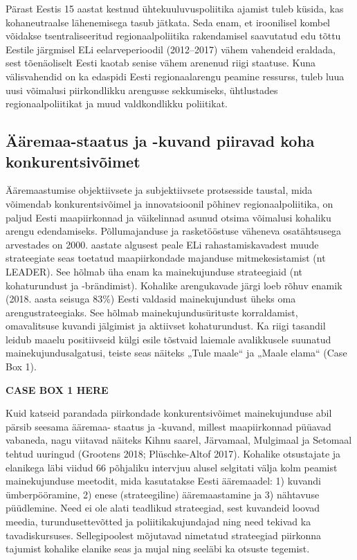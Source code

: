 \documentclass[]{book}
\begin{document}
Pärast Eestis 15 aastat kestnud ühtekuuluvuspoliitika ajamist tuleb küsida, kas kohaneutraalse lähenemisega
tasub jätkata. Seda enam, et iroonilisel kombel võidakse tsentraliseeritud regionaalpoliitika rakendamisel
saavutatud edu tõttu Eestile järgmisel ELi eelarveperioodil (2012--2017) vähem vahendeid eraldada, sest
tõenäoliselt Eesti kaotab senise vähem arenenud riigi staatuse. Kuna välisvahendid on ka edaspidi Eesti
regionaalarengu peamine ressurss, tuleb luua uusi võimalusi piirkondlikku arengusse sekkumiseks,
ühtlustades regionaalpoliitikat ja muud valdkondlikku poliitikat.

\hypertarget{aaremaa-staatus-ja--kuvand-piiravad-koha-konkurentsivoimet}{%
\subsection{Ääremaa-staatus ja -kuvand piiravad koha konkurentsivõimet}\label{aaremaa-staatus-ja--kuvand-piiravad-koha-konkurentsivoimet}}

Ääremaastumise objektiivsete ja subjektiivsete protsesside taustal, mida võimendab konkurentsivõimel ja
innovatsioonil põhinev regionaalpoliitika, on paljud Eesti maapiirkonnad ja väikelinnad asunud otsima
võimalusi kohaliku arengu edendamiseks. Põllumajanduse ja rasketööstuse väheneva osatähtsusega
arvestades on 2000. aastate algusest peale ELi rahastamiskavadest muude strateegiate seas toetatud
maapiirkondade majanduse mitmekesistamist (nt LEADER). See hõlmab üha enam ka mainekujunduse
strateegiaid (nt kohaturundust ja -brändimist). Kohalike arengukavade järgi loeb rõhuv enamik (2018. aasta
seisuga 83\%) Eesti valdasid mainekujundust üheks oma arengustrateegiaks. See hõlmab
mainekujundusürituste korraldamist, omavalitsuse kuvandi jälgimist ja aktiivset kohaturundust. Ka riigi
tasandil leidub maaelu positiivseid külgi esile tõstvaid laiemale avalikkusele suunatud
mainekujundusalgatusi, teiste seas näiteks „Tule maale`` ja „Maale elama`` (Case Box 1).

\textbf{CASE BOX 1 HERE}

Kuid katseid parandada piirkondade konkurentsivõimet mainekujunduse abil pärsib seesama ääremaa-
staatus ja -kuvand, millest maapiirkonnad püüavad vabaneda, nagu viitavad näiteks Kihnu saarel, Järvamaal,
Mulgimaal ja Setomaal tehtud uuringud (Grootens 2018; Plüschke-Altof 2017). Kohalike otsustajate ja
elanikega läbi viidud 66 põhjaliku intervjuu alusel selgitati välja kolm peamist mainekujunduse meetodit,
mida kasutatakse Eesti ääremaadel: 1) kuvandi ümberpööramine, 2) enese (strateegiline) ääremaastamine ja
3) nähtavuse püüdlemine. Need ei ole alati teadlikud strateegiad, sest kuvandeid loovad meedia,
turundusettevõtted ja poliitikakujundajad ning need tekivad ka tavadiskursuses. Sellegipoolest mõjutavad
nimetatud strateegiad piirkonna tajumist kohalike elanike seas ja mujal ning seeläbi ka otsuste tegemist.
\end{document}
